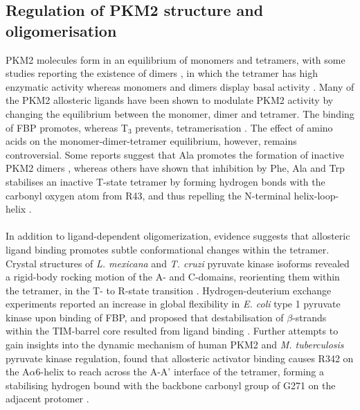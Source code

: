 \subsection{Regulation of PKM2 structure and oligomerisation}
PKM2 molecules form in an equilibrium of monomers and tetramers, with some studies reporting the existence of dimers \cite{Yan:2016aa,Hofmann:1975aa,Gavriilidou:2018aa}, in which the tetramer has high enzymatic activity whereas monomers and dimers display basal activity \cite{Ashizawa:1990aa}. Many of the PKM2 allosteric ligands have been shown to modulate PKM2 activity by changing the equilibrium between the monomer, dimer and tetramer. The binding of FBP promotes, whereas T$_{3}$ prevents, tetramerisation \cite{Ashizawa:1990aa,Anastasiou:2012aa,Gavriilidou:2018aa,Morgan:2013aa,Yan:2016aa}. The effect of amino acids on the monomer-dimer-tetramer equilibrium, however, remains controversial. Some reports suggest that Ala promotes the formation of inactive PKM2 dimers \cite{Hofmann:1975aa,Sparmann:1973aa}, whereas others have shown that inhibition by Phe, Ala and Trp stabilises an inactive T-state tetramer by forming hydrogen bonds with the carbonyl oxygen atom from R43, and thus repelling the N-terminal helix-loop-helix \cite{Morgan:2013aa,Yuan:2018aa}. 
%
%
\\\\
%
%
In addition to ligand-dependent oligomerization, evidence suggests that allosteric ligand binding promotes subtle conformational changes within the tetramer. Crystal structures of \textit{L. mexicana} and \textit{T. cruzi} pyruvate kinase isoforms revealed a rigid-body rocking motion of the A- and C-domains, reorienting them within the tetramer, in the T- to R-state transition \cite{Morgan:2010aa,Morgan:2014aa,Naithani:2015aa}. Hydrogen-deuterium exchange experiments reported an increase in global flexibility in \textit{E. coli} type 1 pyruvate kinase upon binding of FBP, and proposed that destabilisation of $\beta$-strands within the TIM-barrel core resulted from ligand binding \cite{Donovan:2016aa}. Further attempts to gain insights into the dynamic mechanism of human PKM2 and \textit{M. tuberculosis} pyruvate kinase regulation, found that allosteric activator binding causes R342 on the A$\alpha$6-helix to reach across the A-A' interface of the tetramer, forming a stabilising hydrogen bound with the backbone carbonyl group of G271 on the adjacent protomer \cite{Zhong:2017aa,Morgan:2013aa}.
%
%
\\\\
%
%
